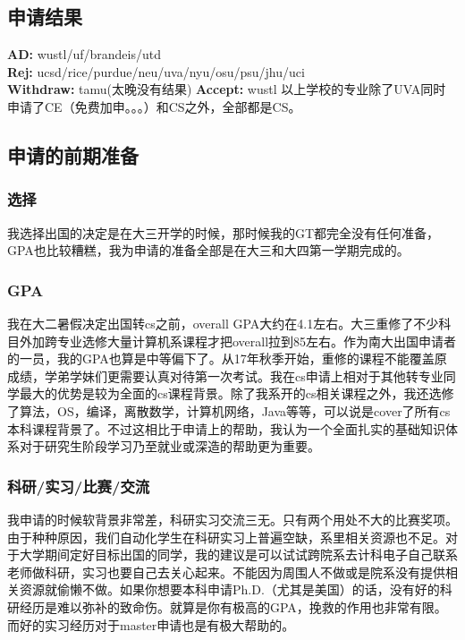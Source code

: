 \documentclass[a4paper,UTF8]{book}
\begin{document}
    \subsection*{申请结果}
        \textbf{AD:} wustl/uf/brandeis/utd\\
        \textbf{Rej:} ucsd/rice/purdue/neu/uva/nyu/osu/psu/jhu/uci\\
        \textbf{Withdraw:} tamu(太晚没有结果)
        \textbf{Accept:} wustl
        以上学校的专业除了UVA同时申请了CE（免费加申。。。）和CS之外，全部都是CS。

    \subsection*{申请的前期准备}
        \subsubsection*{选择}
        我选择出国的决定是在大三开学的时候，那时候我的GT都完全没有任何准备，GPA也比较糟糕，我为申请的准备全部是在大三和大四第一学期完成的。

        \subsubsection*{GPA}
        我在大二暑假决定出国转cs之前，overall GPA大约在4.1左右。大三重修了不少科目外加跨专业选修大量计算机系课程才把overall拉到85左右。作为南大出国申请者的一员，我的GPA也算是中等偏下了。从17年秋季开始，重修的课程不能覆盖原成绩，学弟学妹们更需要认真对待第一次考试。我在cs申请上相对于其他转专业同学最大的优势是较为全面的cs课程背景。除了我系开的cs相关课程之外，我还选修了算法，OS，编译，离散数学，计算机网络，Java等等，可以说是cover了所有cs本科课程背景了。不过这相比于申请上的帮助，我认为一个全面扎实的基础知识体系对于研究生阶段学习乃至就业或深造的帮助更为重要。

        \subsubsection*{科研/实习/比赛/交流}
        我申请的时候软背景非常差，科研实习交流三无。只有两个用处不大的比赛奖项。由于种种原因，我们自动化学生在科研实习上普遍空缺，系里相关资源也不足。对于大学期间定好目标出国的同学，我的建议是可以试试跨院系去计科电子自己联系老师做科研，实习也要自己去关心起来。不能因为周围人不做或是院系没有提供相关资源就偷懒不做。如果你想要本科申请Ph.D.（尤其是美国）的话，没有好的科研经历是难以弥补的致命伤。就算是你有极高的GPA，挽救的作用也非常有限。而好的实习经历对于master申请也是有极大帮助的。
\end{document}
